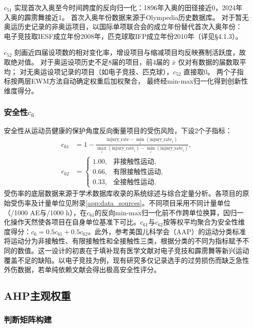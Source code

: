 \documentclass[twoside]{CUGThesis}
\begin{document}
$c_{51}$ 实现首次入奥至今时间跨度的反向归一化：1896年入奥的田径接近0，2024年入奥的霹雳舞接近1。
首次入奥年份数据来源于Olympedia历史数据库。
对于暂无奥运历史记录的非奥运项目，以国际单项联合会的成立年份替代首次入奥年份：
电子竞技取IESF成立年份2008年，匹克球取IFP成立年份2010年（详见§4.1.3）。

$c_{52}$ 刻画近四届设项数的相对变化率，增设项目与缩减项目均反映赛制活跃度，故取绝对值。
对于奥运设项历史不足8届的项目，前4届的 $\bar{x}$ 仅对有数据的届数取平均；
对无奥运设项记录的项目（如电子竞技、匹克球），$c_{52}$ 直接取0。
两个子指标按两层EWM方法自动确定权重后加权聚合，
最终经min-max归一化得到创新性维度得分。
\subsubsection{安全性$c_6$}

安全性从运动员健康的保护角度反向衡量项目的受伤风险，下设2个子指标：
\begin{align}
c_{61} &= 1 - \frac{\text{injury\_rate} - \min_i(\text{injury\_rate}_i)}{\max_i(\text{injury\_rate}_i) - \min_i(\text{injury\_rate}_i)}, \\
c_{62} &=
\begin{cases}
1.00, & \text{非接触性运动}, \\
0.66, & \text{有限接触性运动}, \\
0.33, & \text{全接触性运动},
\end{cases}
\end{align}
受伤率的底层数据来源于学术数据库收录的系统综述与综合定量分析\cite{Lystad2020,Lian2022,Perera2019}。各项目的原始受伤率及计量单位见附录\ref{app:data_sources}。不同项目采用不同计量单位（/1000 AE与/1000 h），在$c_{61}$的反向min-max归一化前不作跨单位换算，因归一化操作天然使各项目在自身单位基准下可比。$c_{61}$与$c_{62}$按等权平均聚合为安全性维度得分：$c_6 = 0.5 c_{61} + 0.5 c_{62}$。此外，参考美国儿科学会（AAP）的运动分类标准\cite{Rice2008}将运动分为非接触性、有限接触性和全接触性三类，根据分类的不同为指标赋予不同的数值。这一设计的初衷在于填补现有医学文献对电子竞技和霹雳舞等新兴运动覆盖不足的缺陷。以电子竞技为例，现有研究多仅记录选手的过劳损伤而缺乏急性外伤数据，若单纯依赖文献会得出极高安全性评分。

\subsection{AHP主观权重}

\subsubsection{判断矩阵构建}
\end{document}
